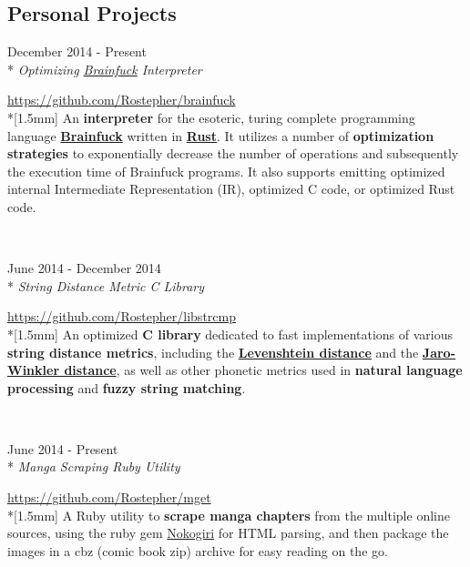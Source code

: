 \documentclass[a4paper,margin,line]{resume}
\newcommand{\rvspace}{1.5mm} %
\newcommand{\rurl}[1]{\hfill {\footnotesize \url{#1}}}
\newcommand{\rdate}[1]{\hfill {\small #1}}
\newcommand{\rdescription}[1]{\small #1 \normalsize}
\newcommand{\ritem}[5] {
    \item[#1]                               %
    \hfill \rdate{#2} \\*                   %
    \hfill {\small \emph{#3}}               %
    \strut \hfill \rurl{#4} \\*[\rvspace]    %
    \rdescription{#5}                       %
}
\newcommand{\rproject}{\ritem}
\begin{document}
\begin{resume}
\section{\mysidestyle Personal Projects}
    \begin{asparadesc}
        \rproject {brainfuck}
                  {December 2014 - Present}
                  {Optimizing \href{https://en.wikipedia.org/wiki/Brainfuck}
                                   {Brainfuck} Interpreter}
                  {https://github.com/Rostepher/brainfuck}
        {
            An {\bf interpreter} for the esoteric, turing complete programming
            language \href{https://en.wikipedia.org/wiki/Brainfuck}{\bf Brainfuck}
            written in \href{https://rust-lang.org}{\bf Rust}. It utilizes a
            number of {\bf optimization strategies} to exponentially decrease
            the number of operations and subsequently the execution time of
            Brainfuck programs. It also supports emitting optimized internal
            Intermediate Representation (IR), optimized C code, or optimized
            Rust code.
        }
        \\

        \rproject {libstrcmp}
                  {June 2014 - December 2014}
                  {String Distance Metric C Library}
                  {https://github.com/Rostepher/libstrcmp}
        {
            An optimized {\bf C library} dedicated to fast implementations of
            various {\bf string distance metrics}, including the
            \href{https://en.wikipedia.org/wiki/Levenshtein_distance}
            {\bf Levenshtein distance} and the
            \href{https://en.wikipedia.org/wiki/Jaro-Winkler_distance}
            {\bf Jaro-Winkler distance}, as well as other phonetic metrics used
            in {\bf natural language processing} and {\bf fuzzy string matching}.
        }
        \\

        \rproject {mget}
                  {June 2014 - Present}
                  {Manga Scraping Ruby Utility}
                  {https://github.com/Rostepher/mget}
        {
            A Ruby utility to {\bf scrape manga chapters} from the multiple
            online sources, using the ruby gem \href{http://nokogiri.org/}
            {Nokogiri} for HTML parsing, and then package the images in a
            cbz (comic book zip) archive for easy reading on the go.
        }
    \end{asparadesc}


\end{resume}
\end{document}
